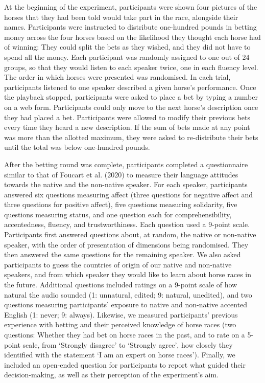\documentclass[
  man,floatsintext]{apa7}
\begin{document}
At the beginning of the experiment, participants were shown four pictures of the horses that they had been told would take part in the race, alongside their names. Participants were instructed to distribute one-hundred pounds in betting money across the four horses based on the likelihood they thought each horse had of winning: They could split the bets as they wished, and they did not have to spend all the money. Each participant was randomly assigned to one out of 24 groups, so that they would listen to each speaker twice, one in each fluency level. The order in which horses were presented was randomised. In each trial, participants listened to one speaker described a given horse's performance. Once the playback stopped, participants were asked to place a bet by typing a number on a web form. Participants could only move to the next horse's description once they had placed a bet. Participants were allowed to modify their previous bets every time they heard a new description. If the sum of bets made at any point was more than the allotted maximum, they were asked to re-distribute their bets until the total was below one-hundred pounds.

After the betting round was complete, participants completed a questionnaire similar to that of Foucart et al. (2020) to measure their language attitudes towards the native and the non-native speaker. For each speaker, participants answered six questions measuring affect (three questions for negative affect and three questions for positive affect), five questions measuring solidarity, five questions measuring status, and one question each for comprehensibility, accentedness, fluency, and trustworthiness. Each question used a 9-point scale. Participants first answered questions about, at random, the native or non-native speaker, with the order of presentation of dimensions being randomised. They then answered the same questions for the remaining speaker. We also asked participants to guess the countries of origin of our native and non-native speakers, and from which speaker they would like to learn about horse races in the future. Additional questions included ratings on a 9-point scale of how natural the audio sounded (1: unnatural, edited; 9: natural, unedited), and two questions measuring participants' exposure to native and non-native accented English (1: never; 9: always). Likewise, we measured participants' previous experience with betting and their perceived knowledge of horse races (two questions: Whether they had bet on horse races in the past, and to rate on a 5-point scale, from `Strongly disagree' to `Strongly agree', how closely they identified with the statement `I am an expert on horse races'). Finally, we included an open-ended question for participants to report what guided their decision-making, as well as their perception of the experiment's aim.
\end{document}
